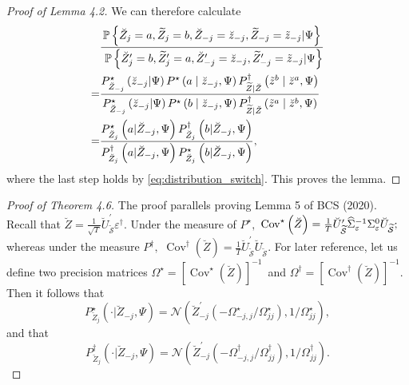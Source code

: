 ﻿\documentclass[12pt]{article}
\newcommand{\0}{\mbox{\bf 0}}
\theoremstyle{plain}%
\theoremstyle{definition}
\DeclareMathOperator{\Cov}{Cov}
\begin{document}
{\begin{proof}[Proof of Lemma  4.2]
We can therefore calculate 
\begin{align*}
& \frac{\mathbb{P}\left\{ \breve{Z}_{j}=a,\widetilde{Z}_{j}=b,\breve{Z}%
_{-j}= \breve{z}_{-j},\widetilde{Z}_{-j}=\tilde{z}_{-j}|\Psi \right\} }{%
\mathbb{\ P}\left\{ \breve{Z}_{j}^{\prime }=b,\widetilde{Z}_{j}^{\prime }=a,%
\breve{Z} _{-j}^{\prime }=\breve{z}_{-j},\widetilde{Z}_{-j}^{\prime }=\tilde{%
z} _{-j}|\Psi \right\} } \\
= & \frac{P_{\breve{Z}_{-j}}^{\star }\left( \breve{z}_{-j}|\Psi \right)
P^{\star }\left( a\mid \breve{z}_{-j},\Psi \right) P_{\widetilde{Z}|\breve{Z}
}^{\dagger }\left( \tilde{z}^{b}\mid \breve{z}^{a},\Psi \right) }{P_{ \breve{%
Z}_{-j}}^{\star }\left( \breve{z}_{-j}|\Psi \right) P^{\star }\left( b\mid 
\breve{z}_{-j},\Psi \right) P_{\widetilde{Z}|\breve{Z}}^{\dagger }\left( 
\tilde{z}^{a}\mid \breve{z}^{b},\Psi \right) } \\
= &\frac{P_{\breve{Z}_{j}}^{\star }\left( a|\breve{Z}_{-j},\Psi \right) P_{ 
\breve{Z}_{j}}^{\dagger }\left( b|\breve{Z}_{-j},\Psi \right) }{P_{\breve{Z}
_{j}}^{\dagger }\left( a|\breve{Z}_{-j},\Psi \right) P_{\breve{Z}
_{j}}^{\star }\left( b|\breve{Z}_{-j},\Psi \right) },
\end{align*}
where the last step holds by \eqref{eq:distribution_switch}. This proves the
lemma.
\end{proof}

\bigskip

\begin{proof}[Proof of Theorem 4.6]
The proof parallels proving Lemma 5 of BCS (2020). Recall that $\breve{Z}= 
\frac{1}{\sqrt{T}}\breve{U}_{{\widetilde{\mathcal{S}}}}^{\prime }\varepsilon
^{\dagger }.$ Under the measure of $P^{\star },$ $\Cov^{\star }\left( \breve{%
		Z}\right) =\frac{1}{T}\breve{U}_{{\widetilde{\mathcal{S}}}}^{\prime} 
\widehat{\Sigma }_{\varepsilon }^{-1}\Sigma _{\varepsilon }^{0}\breve{U}_{{%
\widetilde{\mathcal{S}}}};$ whereas under the measure $P^{\dagger },$ $\Cov
^{\dagger }\left( \breve{Z}\right) =\frac{1}{T}\breve{U}_{{\widetilde{ 
\mathcal{S}}}}^{\prime }\breve{U}_{{\widetilde{\mathcal{S}}}}.$ For later
reference, let us define two precision matrices $\Omega ^{\star }=\left[ 
\Cov
^{\star }\left( \breve{Z}\right) \right] ^{-1}$\ and $\Omega ^{\dagger }= %
\left[ \Cov^{\dagger }\left( \breve{Z}\right) \right] ^{-1}.$ Then it
follows that 
\begin{equation*}
P_{\breve{Z}_{j}}^{\star }\left( \cdot |\breve{Z}_{-j},\Psi \right) = 
\mathcal{N}\left( \breve{Z}_{-j}^{\prime }\left( -\Omega _{-j,j}^{\star
}/\Omega _{jj}^{\star }\right) ,1/\Omega _{jj}^{\star }\right) ,
\end{equation*}
and that 
\begin{equation*}
P_{\breve{Z}_{j}}^{\dagger }\left( \cdot |\breve{Z}_{-j},\Psi \right) = 
\mathcal{N}\left( \breve{Z}_{-j}^{\prime }\left( -\Omega _{-j,j}^{\dagger
}/\Omega _{jj}^{\dagger }\right) ,1/\Omega _{jj}^{\dagger }\right) .
\end{equation*}


\end{proof}}
\end{document}
